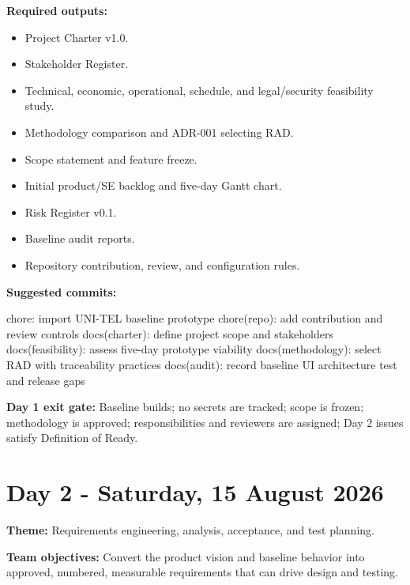 \documentclass[
  10pt,
  a4paper,
  oneside]{report}
\newenvironment{Shaded}{}{}
\newcommand{\NormalTok}[1]{#1}
\providecommand{\tightlist}{%
  \setlength{\itemsep}{0pt}\setlength{\parskip}{0pt}}
\begin{document}
\textbf{Required outputs:}

\begin{itemize}
\tightlist
\item
  Project Charter v1.0.
\item
  Stakeholder Register.
\item
  Technical, economic, operational, schedule, and legal/security
  feasibility study.
\item
  Methodology comparison and ADR-001 selecting RAD.
\item
  Scope statement and feature freeze.
\item
  Initial product/SE backlog and five-day Gantt chart.
\item
  Risk Register v0.1.
\item
  Baseline audit reports.
\item
  Repository contribution, review, and configuration rules.
\end{itemize}

\textbf{Suggested commits:}

\begin{Shaded}
\begin{Highlighting}[]
\NormalTok{chore: import UNI{-}TEL baseline prototype}
\NormalTok{chore(repo): add contribution and review controls}
\NormalTok{docs(charter): define project scope and stakeholders}
\NormalTok{docs(feasibility): assess five{-}day prototype viability}
\NormalTok{docs(methodology): select RAD with traceability practices}
\NormalTok{docs(audit): record baseline UI architecture test and release gaps}
\end{Highlighting}
\end{Shaded}

\textbf{Day 1 exit gate:} Baseline builds; no secrets are tracked; scope
is frozen; methodology is approved; responsibilities and reviewers are
assigned; Day 2 issues satisfy Definition of Ready.

\section{Day 2 - Saturday, 15 August
2026}\label{day-2---saturday-15-august-2026}

\textbf{Theme:} Requirements engineering, analysis, acceptance, and test
planning.

\textbf{Team objectives:} Convert the product vision and baseline
behavior into approved, numbered, measurable requirements that can drive
design and testing.
\end{document}
